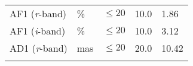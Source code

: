 \documentclass[DM,toc]{lsstdoc}
\begin{document}
\begin{longtable}[]{@{}lllll@{}}
\begin{minipage}[t]{0.19\columnwidth}\raggedright\strut
AF1 (\emph{r}-band)\strut
\end{minipage} & \begin{minipage}[t]{0.08\columnwidth}\raggedright\strut
\%\strut
\end{minipage} & \begin{minipage}[t]{0.20\columnwidth}\raggedright\strut
\(\leq 20\)\strut
\end{minipage} & \begin{minipage}[t]{0.22\columnwidth}\raggedright\strut
10.0\strut
\end{minipage} & \begin{minipage}[t]{0.17\columnwidth}\raggedright\strut
1.86\strut
\end{minipage}\tabularnewline
\begin{minipage}[t]{0.19\columnwidth}\raggedright\strut
AF1 (\emph{i}-band)\strut
\end{minipage} & \begin{minipage}[t]{0.08\columnwidth}\raggedright\strut
\%\strut
\end{minipage} & \begin{minipage}[t]{0.20\columnwidth}\raggedright\strut
\(\leq 20\)\strut
\end{minipage} & \begin{minipage}[t]{0.22\columnwidth}\raggedright\strut
10.0\strut
\end{minipage} & \begin{minipage}[t]{0.17\columnwidth}\raggedright\strut
3.12\strut
\end{minipage}\tabularnewline
\begin{minipage}[t]{0.19\columnwidth}\raggedright\strut
AD1 (\emph{r}-band)\strut
\end{minipage} & \begin{minipage}[t]{0.08\columnwidth}\raggedright\strut
mas\strut
\end{minipage} & \begin{minipage}[t]{0.20\columnwidth}\raggedright\strut
\(\leq 20\)\strut
\end{minipage} & \begin{minipage}[t]{0.22\columnwidth}\raggedright\strut
20.0\strut
\end{minipage} & \begin{minipage}[t]{0.17\columnwidth}\raggedright\strut
10.42\strut
\end{minipage}\tabularnewline
\begin{minipage}[t]{0.19\columnwidth}\raggedright\strut

\end{minipage}
\end{longtable}
\end{document}
